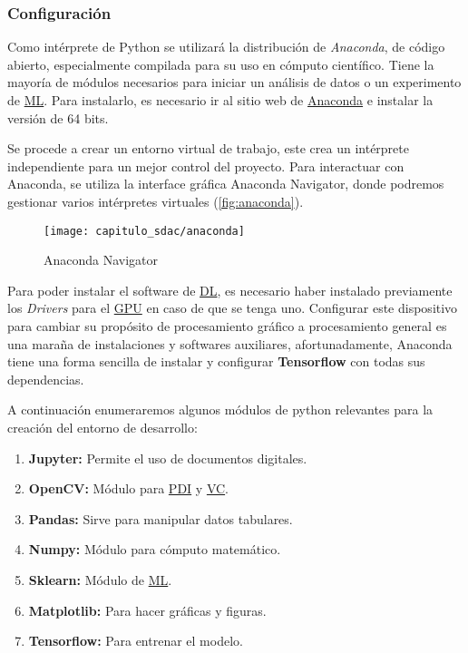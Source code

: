 \subsubsection{Configuración}

Como intérprete de Python se utilizará la distribución de \emph{Anaconda}, de
código abierto, especialmente compilada para su uso en cómputo científico. Tiene
la mayoría de módulos necesarios para iniciar un análisis de datos o un
experimento de \hyperlink{abbr}{ML}. Para instalarlo, es necesario ir al sitio
web de \href{https://www.anaconda.com/distribution/}{Anaconda} e instalar la
versión de 64 bits.

Se procede a crear un entorno virtual de trabajo, este crea un intérprete
independiente para un mejor control del proyecto. Para interactuar con Anaconda,
se utiliza la interface gráfica Anaconda Navigator, donde podremos gestionar
varios intérpretes virtuales (\autoref{fig:anaconda}).

\begin{figure}[H]
    \centering
    \texttt{[image: capitulo\_sdac/anaconda]}
    \caption{Anaconda Navigator}\label{fig:anaconda}
\end{figure}

Para poder instalar el software de \hyperlink{abbr}{DL}, es necesario haber
instalado previamente los \emph{Drivers} para el \hyperlink{abbr}{GPU} en caso
de que se tenga uno. Configurar este dispositivo para cambiar su propósito de
procesamiento gráfico a procesamiento general es una maraña de instalaciones y
softwares auxiliares, afortunadamente, Anaconda tiene una forma sencilla de
instalar y configurar \textbf{Tensorflow} con todas sus dependencias.

A continuación enumeraremos algunos módulos de python relevantes para la creación
del entorno de desarrollo:

\begin{enumerate}
    \item{\textbf{Jupyter: }} Permite el uso de documentos digitales.
    \item{\textbf{OpenCV: }} Módulo para \hyperlink{abbr}{PDI} y \hyperlink{abbr}{VC}.
    \item{\textbf{Pandas: }} Sirve para manipular datos tabulares.
    \item{\textbf{Numpy: }} Módulo para cómputo matemático.
    \item{\textbf{Sklearn: }} Módulo de \hyperlink{abbr}{ML}.
    \item{\textbf{Matplotlib: }} Para hacer gráficas y figuras.
    \item{\textbf{Tensorflow: }} Para entrenar el modelo.
\end{enumerate}

